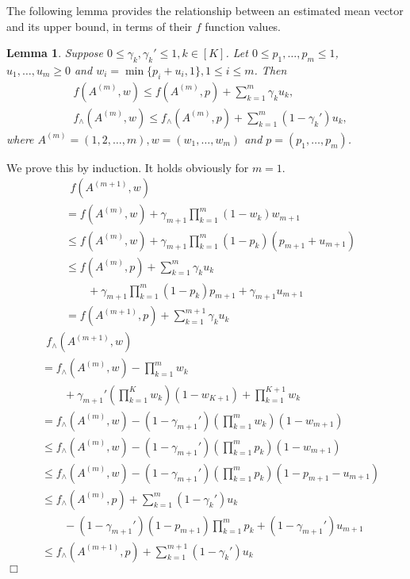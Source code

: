 \documentclass{article}
\newtheorem{lemma}[theorem]{Lemma}%
\newenvironment{proof}{\noindent {\textbf{Proof. }}}{$\Box$ \medskip}
\newcommand{\wei}[1]{}
\newcommand{\wei}[1]{{\color{blue!50!black}  [\text{Wei:} #1]}}
\begin{document}
The following lemma provides the relationship between an estimated mean vector and its
	upper bound, in terms of their $f$ function values.
\wei{The symbol here may need to be changed. $w_i$ coincides with weight $w_i$ before, 
		and $p$ coincides with many related probability definition using $p$.
	$w_i$ can be replaced with $u_i$ (standing for upper bound), 
	$u_i$ can be replaced with $r_i$ (standing for radius), but not sure yet
	about $p_i$.}
\begin{lemma}
\label{lem:estimateTech}
Suppose $0 \leq \gamma_k, \gamma_k' \leq 1, k \in [K]$. Let $0 \leq p_1, \ldots, p_m \leq 1$, $u_1, \ldots, u_m \geq 0$ and $w_i = \min\{p_i + u_i, 1\}, 1 \leq i \leq m$. Then
\begin{align*}
&f(A^{(m)}, w) \leq f(A^{(m)}, p) + \sum_{k=1}^{m} \gamma_k u_k,\\
&f_{\wedge}(A^{(m)}, w) \leq f_{\wedge}(A^{(m)}, p) + \sum_{k=1}^{m} (1 - \gamma_k') u_k,
\end{align*}
where $A^{(m)} = (1, 2, \ldots, m), w = (w_1, \ldots, w_m)$ and $p = (p_1, \ldots, p_m)$.
\end{lemma}
\begin{proof}
We prove this by induction. It holds obviously for $m = 1$.
\begin{align*}
&~~f(A^{(m+1)}, w)\\
&= f(A^{(m)}, w) + \gamma_{m+1}\prod_{k=1}^m(1 - w_k) w_{m+1}\\
&\leq f(A^{(m)}, w) +  \gamma_{m+1} \prod_{k=1}^m(1 - p_k) (p_{m+1} + u_{m+1})\\
&\leq f(A^{(m)}, p) + \sum_{k=1}^m \gamma_k u_k \\
&\qquad + \gamma_{m+1} \prod_{k=1}^m(1 - p_k) p_{m+1} + \gamma_{m+1} u_{m+1}\\
&= f(A^{(m+1)}, p) + \sum_{k=1}^{m+1} \gamma_k u_k
\end{align*}
\begin{align*}
&~~f_{\wedge}(A^{(m+1)}, w) \\
&= f_{\wedge}(A^{(m)}, w) -\prod_{k=1}^{m} w_k \\
&\qquad+ \gamma_{m+1}' (\prod_{k=1}^{K} w_k) (1 - w_{K+1})+ \prod_{k=1}^{K+1} w_k\\
&= f_{\wedge}(A^{(m)}, w) - (1 - \gamma_{m+1}') (\prod_{k=1}^{m} w_k) (1 - w_{m+1})\\
&\leq f_{\wedge}(A^{(m)}, w) - (1 - \gamma_{m+1}') (\prod_{k=1}^{m} p_k) (1 - w_{m+1})\\
&\leq f_{\wedge}(A^{(m)}, w) -(1 - \gamma_{m+1}') (\prod_{k=1}^{m} p_k)  (1 - p_{m+1} - u_{m+1})\\
&\leq f_{\wedge}(A^{(m)}, p) +  \sum_{k=1}^{m} (1 - \gamma_k') u_k \\
&\qquad - (1 - \gamma_{m+1}') (1 - p_{m+1}) \prod_{k=1}^{m} p_k + (1 - \gamma_{m+1}') u_{m+1}\\
&\leq f_{\wedge}(A^{(m+1)}, p) + \sum_{k=1}^{m+1} (1 - \gamma_k') u_k
\end{align*}
\end{proof}
\end{document}
